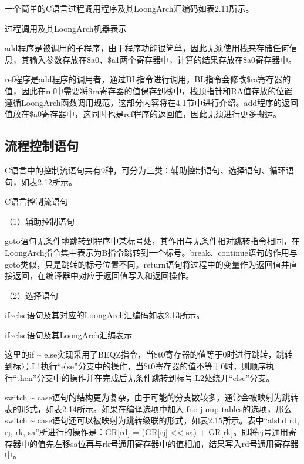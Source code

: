 \documentclass[]{ctexbook}
\begin{document}
一个简单的C语言过程调用程序及其LoongArch汇编码如表2.11所示。

\label{tab:c-vs-as}过程调用及其LoongArch机器表示

add程序是被调用的子程序，由于程序功能很简单，因此无须使用栈来存储任何信息，其输入参数存放在\$a0、\$a1两个寄存器中，计算的结果存放在\$a0寄存器中。

ref程序是add程序的调用者，通过BL指令进行调用，BL指令会修改\$ra寄存器的值，因此在ref中需要将\$ra寄存器的值保存到栈中，栈顶指针和RA值存放的位置遵循LoongArch函数调用规范，这部分内容将在4.1节中进行介绍。add程序的返回值放在\$a0寄存器中，这同时也是ref程序的返回值，因此无须进行更多搬运。

\hypertarget{ux6d41ux7a0bux63a7ux5236ux8bedux53e5}{%
\subsection{流程控制语句}\label{ux6d41ux7a0bux63a7ux5236ux8bedux53e5}}

C语言中的控制流语句共有9种，可分为三类：辅助控制语句、选择语句、循环语句，如表2.12所示。

\label{tab:c-control}C语言控制流语句

（1）辅助控制语句

goto语句无条件地跳转到程序中某标号处，其作用与无条件相对跳转指令相同，在LoongArch指令集中表示为B指令跳转到一个标号。break、continue语句的作用与goto类似，只是跳转的标号位置不同。return语句将过程中的变量作为返回值并直接返回，在编译器中对应于返回值写入和返回操作。

（2）选择语句

if\textasciitilde else语句及其对应的LoongArch汇编码如表2.13所示。

\label{tab:if-else}if\textasciitilde else语句及其LoongArch汇编表示

这里的if \textasciitilde{} else实现采用了BEQZ指令，当\$t0寄存器的值等于0时进行跳转，跳转到标号.L1执行``else''分支中的操作，当\$t0寄存器的值不等于0时，则顺序执行``then''分支中的操作并在完成后无条件跳转到标号.L2处绕开``else''分支。

switch \textasciitilde{} case语句的结构更为复杂，由于可能的分支数较多，通常会被映射为跳转表的形式，如表2.14所示。如果在编译选项中加入-fno-jump-tables的选项，那么switch \textasciitilde{} case语句还可以被映射为跳转级联的形式，如表2.15所示。表中``alsl.d rd, rj, rk, sa''所进行的操作是：GR{[}rd{]} = (GR{[}rj{]} \textless\textless{} sa) + GR{[}rk{]}。即将rj号通用寄存器中的值先左移sa位再与rk号通用寄存器中的值相加，结果写入rd号通用寄存器中。
\end{document}

